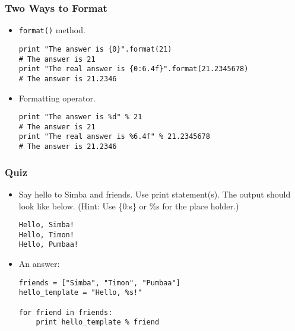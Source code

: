 \documentclass{beamer}
\begin{document}
\begin{frame}[fragile]
\frametitle{Two Ways to Format}
\begin{itemize}
\item \lstinline{format()} method.
\begin{lstlisting}
print "The answer is {0}".format(21)
# The answer is 21
print "The real answer is {0:6.4f}".format(21.2345678)
# The answer is 21.2346
\end{lstlisting}
\item Formatting operator.
\begin{lstlisting}
print "The answer is %d" % 21
# The answer is 21
print "The real answer is %6.4f" % 21.2345678
# The answer is 21.2346
\end{lstlisting}
\end{itemize}
\end{frame}

\begin{frame}[fragile]
\frametitle{Quiz}
\begin{itemize}
\item Say hello to Simba and friends. Use print statement(s).
    The output should look like below. (Hint: Use
    \{0:s\} or \%s for the place holder.)
\begin{lstlisting}
Hello, Simba!
Hello, Timon!
Hello, Pumbaa!
\end{lstlisting}
\item An answer:
\begin{lstlisting}
friends = ["Simba", "Timon", "Pumbaa"]
hello_template = "Hello, %s!"

for friend in friends:
    print hello_template % friend
\end{lstlisting}
\end{itemize}
\end{frame}
\end{document}
